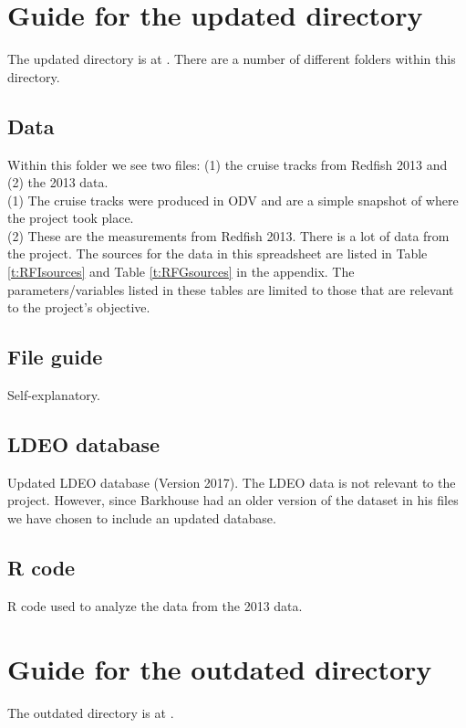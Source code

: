 \documentclass[journal, a4paper]{article} %
\begin{document}
\section{Guide for the updated directory}

The updated directory is at . There are a number of different folders within this directory. 

\subsection{Data}

Within this folder we see two files: (1) the cruise tracks from Redfish 2013 and (2) the 2013 data.
\\[12pt]
(1) The cruise tracks were produced in ODV and are a simple snapshot of where the project took place. 
\\[12pt]
(2) These are the measurements from Redfish 2013. There is a lot of data from the project. The sources for the data in this spreadsheet are listed in Table \ref{t:RFIsources} and Table \ref{t:RFGsources} in the appendix. The parameters/variables listed in these tables are limited to those that are relevant to the project's objective. 

\subsection{File guide}

Self-explanatory.  

\subsection{LDEO database}
Updated LDEO database (Version 2017). The LDEO data is not relevant to the project. However, since Barkhouse had an older version of the dataset in his files we have chosen to include an updated database.  

\subsection{R code}
R code used to analyze the data from the 2013 data. 

\section{Guide for the outdated directory} 

The outdated directory is at . 
\end{document}
